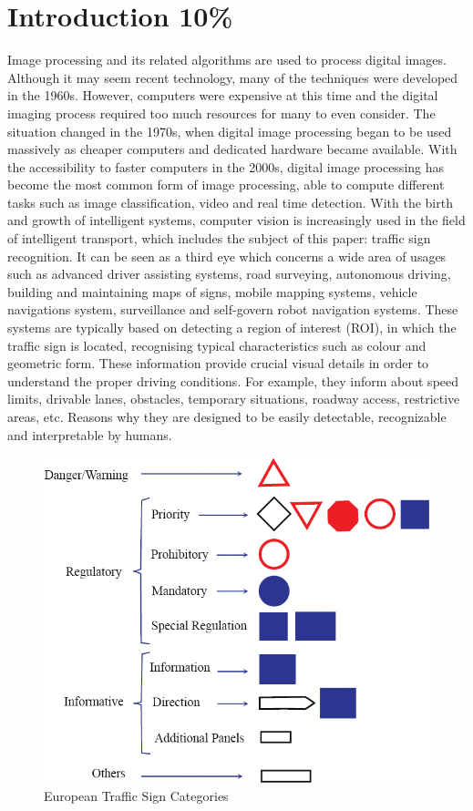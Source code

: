 \section{Introduction 10\%}
Image processing and its related algorithms are used to process digital images. Although it may seem recent technology, many of the techniques were developed in the 1960s. However, computers were expensive at this time and the digital imaging process required too much resources for many to even consider. The situation changed in the 1970s, when digital image processing began to be used massively as cheaper computers and dedicated hardware became available. With the accessibility to faster computers in the 2000s, digital image processing has become the most common form of image processing, able to compute different tasks such as image classification, video and real time detection. With the birth and growth of intelligent systems, computer vision is increasingly used in the field of intelligent transport, which includes the subject of this paper: traffic sign recognition. It can be seen as a third eye which concerns a wide area of usages such as advanced driver assisting systems, road surveying, autonomous driving, building and maintaining maps of signs, mobile mapping systems, vehicle navigations system, surveillance and self-govern robot navigation systems. These systems are typically based on detecting a region of interest (ROI), in which the traffic sign is located, recognising typical characteristics such as colour and geometric form. These information provide crucial visual details in order to understand the proper driving conditions. For example, they inform about speed limits, drivable lanes, obstacles, temporary situations, roadway access, restrictive areas, etc. Reasons why they are designed to be easily detectable, recognizable and interpretable by humans.
\begin{figure}[h]
	\includegraphics[width=\linewidth]{Res/Immagini/european-traffic-signs.PNG}	
	\caption{European Traffic Sign Categories}
\end{figure}


